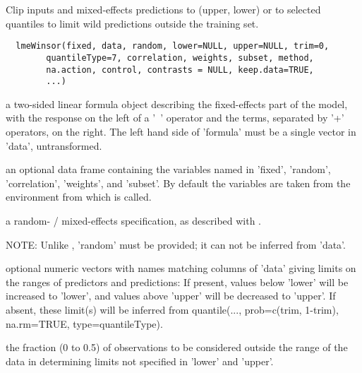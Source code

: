 \begin{Description}\relax
Clip inputs and mixed-effects predictions to (upper, lower) or to
selected quantiles to limit wild predictions outside the training
set.
\end{Description}
\begin{Usage}
\begin{verbatim}
  lmeWinsor(fixed, data, random, lower=NULL, upper=NULL, trim=0,
        quantileType=7, correlation, weights, subset, method,
        na.action, control, contrasts = NULL, keep.data=TRUE, 
        ...)
\end{verbatim}
\end{Usage}
\begin{Arguments}
\begin{ldescription}
\item[\code{fixed}] a two-sided linear formula object describing the fixed-effects part
of the model, with the response on the left of a '~' operator and
the terms, separated by '+' operators, on the right.  The left hand
side of 'formula' must be a single vector in 'data', untransformed.

\item[\code{data}] an optional data frame containing the variables named in 'fixed',
'random', 'correlation', 'weights', and 'subset'.  By default the
variables are taken from the environment from which 
is  called. 

\item[\code{random}] a random- / mixed-effects specification, as described with
.

NOTE:  Unlike , 'random' must be provided;  it can
not be inferred from 'data'.  

\item[\code{lower, upper}] optional numeric vectors with names matching columns of 'data'
giving limits on the ranges of predictors and predictions:  If
present, values below 'lower' will be increased to 'lower', and
values above 'upper' will be decreased to 'upper'.  If absent, these
limit(s) will be inferred from quantile(..., prob=c(trim, 1-trim),
na.rm=TRUE, type=quantileType).  

\item[\code{trim}] the fraction (0 to 0.5) of observations to be considered outside the
range of the data in determining limits not specified in 'lower' and
'upper'.  


\end{ldescription}
\end{Arguments}
